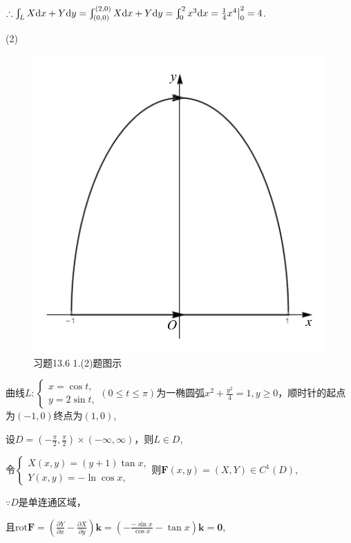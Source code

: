 \documentclass[12pt,UTF8]{ctexart}
\newcommand{\Int}[4]{\varint\nolimits_{#1}^{#2}#3\mathrm d#4}
\newcommand{\BLInt}[2]{\varint\nolimits_{#1}#2}
\newcommand{\md}[1]{\mathrm d#1}
\newcommand{\pp}[2]{\frac{\partial #1}{\partial #2}}
\begin{document}
\begin{enumerate}
$\therefore\BLInt L{X\md x+Y\md y}=\varint_{(0,0)}^{(2,0)}{X\md x+Y\md y}=\Int02{x^3}x=\frac14x^4\big|_0^2=4$.

(2)\begin{figure}[H]
\begin{center}
\includegraphics[height=0.3\textheight]{Figures25/Fig13-6-1-2.pdf}
\end{center}
\caption{习题13.6 1.(2)题图示}
\label{13-6-1-2}
\end{figure}

曲线$L:\begin{cases}
x=\cos t,\\
y=2\sin t,
\end{cases}(0\leqslant t\leqslant\pi)$为一椭圆弧$x^2+\frac{y^2}4=1,y\geqslant0$，顺时针的起点为$(-1,0)$终点为$(1,0)$,

设$D=(-\frac\pi2,\frac\pi2)\times(-\infty,\infty)$，则$L\in D$,

令$\begin{cases}
X(x,y)=(y+1)\tan x,\\
Y(x,y)=-\ln\cos x,
\end{cases}$则$\bm F(x,y)=(X,Y)\in C^1(D)$,

$\because D$是单连通区域，

且$\text{rot}\bm F=(\pp Yx-\pp Xy)\bm k=(-\frac{-\sin x}{\cos x}-\tan x)\bm k=\bm0$,


\end{enumerate}
\end{document}
